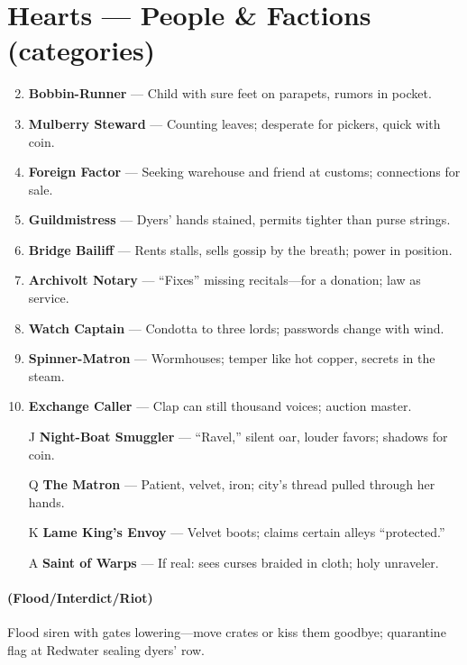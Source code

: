 \section*{Hearts --- People \& Factions (categories)}
\label{sec:silkstrand-people}
\begin{enumerate}
\setcounter{enumi}{1}
\item \textbf{Bobbin-Runner} --- Child with sure feet on parapets, rumors in pocket.
\item \textbf{Mulberry Steward} --- Counting leaves; desperate for pickers, quick with coin.
\item \textbf{Foreign Factor} --- Seeking warehouse and friend at customs; connections for sale.
\item \textbf{Guildmistress} --- Dyers' hands stained, permits tighter than purse strings.
\item \textbf{Bridge Bailiff} --- Rents stalls, sells gossip by the breath; power in position.
\item \textbf{Archivolt Notary} --- ``Fixes'' missing recitals---for a donation; law as service.
\item \textbf{Watch Captain} --- Condotta to three lords; passwords change with wind.
\item \textbf{Spinner-Matron} --- Wormhouses; temper like hot copper, secrets in the steam.
\item \textbf{Exchange Caller} --- Clap can still thousand voices; auction master.
\item[J] \textbf{Night-Boat Smuggler} --- ``Ravel,'' silent oar, louder favors; shadows for coin.
\item[Q] \textbf{The Matron} --- Patient, velvet, iron; city's thread pulled through her hands.
\item[K] \textbf{Lame King's Envoy} --- Velvet boots; claims certain alleys ``protected.''
\item[A] \textbf{Saint of Warps} --- If real: sees curses braided in cloth; holy unraveler.
\end{enumerate}

\paragraph*{(Flood/Interdict/Riot)} Flood siren with gates lowering---move crates or kiss them goodbye; quarantine flag at Redwater sealing dyers' row.


